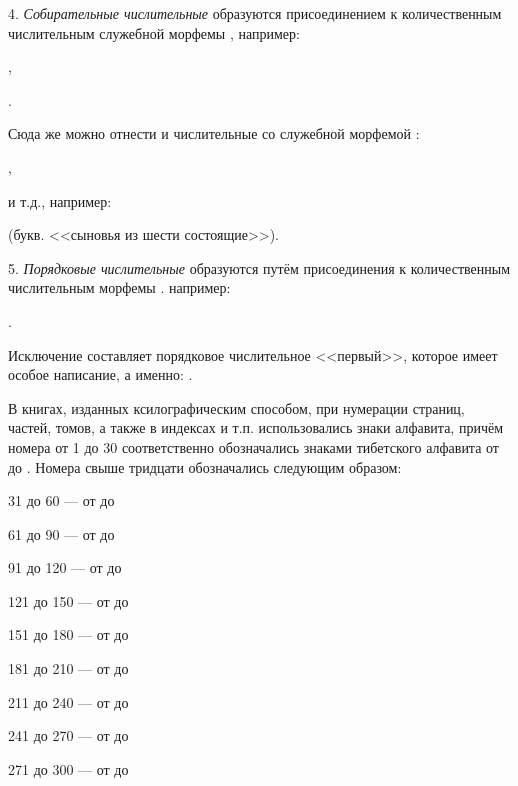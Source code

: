 4. \emph{Собирательные числительные} образуются присоединением к количественным числительным служебной морфемы , например:
\begin{prfsample}
    \item {},
    \item {}.
\end{prfsample}

Сюда же можно отнести и числительные со служебной морфемой :
\begin{prfsample}
    \item {},
    \item {}
\end{prfsample}
и т.д., например:
\begin{prfsample}
    \item {} (букв. <<сыновья из шести состоящие>>).
\end{prfsample}

5. \emph{Порядковые числительные} образуются путём присоединения к количественным числительным морфемы . например:
\begin{prfsample}
    \item {}.
\end{prfsample}
Исключение составляет порядковое числительное <<первый>>, которое имеет особое написание, а именно: .

В книгах, изданных ксилографическим способом, при нумерации страниц, частей, томов, а также в индексах и т.п. использовались знаки алфавита, причём номера от 1 до 30 соответственно обозначались знаками тибетского алфавита от  до . Номера свыше тридцати обозначались следующим образом:
\begin{description}
    \item 31 до 60 --- от  до 
    \item 61 до 90 --- от  до 
    \item 91 до 120 --- от  до 
    \item 121 до 150 --- от  до 
    \item 151 до 180 --- от	 до 
    \item 181 до 210 --- от	 до 
    \item 211 до 240 --- от  до 
    \item 241 до 270 --- от  до 
    \item 271 до 300 --- от  до 
\end{description}


